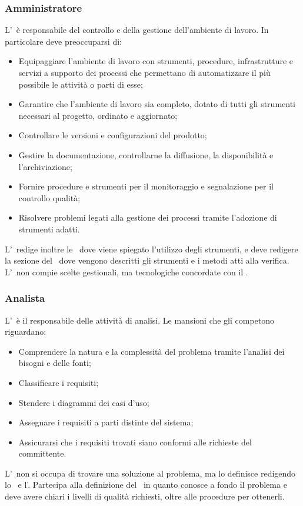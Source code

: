 \documentclass[../NormeProgetto.tex]{subfiles}
\begin{document}
		\subsubsection{Amministratore}
		L'\amministratore\ è responsabile del controllo e della gestione dell'ambiente di lavoro. In particolare deve preoccuparsi di:
		\begin{itemize}
		\item Equipaggiare l'ambiente di lavoro con strumenti, procedure, infrastrutture e servizi a supporto dei processi che permettano di automatizzare il più possibile le attività o parti di esse;
		\item Garantire che l'ambiente di lavoro sia completo, dotato di tutti gli strumenti necessari al progetto, ordinato e aggiornato;
		\item Controllare le versioni e configurazioni del prodotto;
		\item Gestire la documentazione, controllarne la diffusione, la disponibilità e l'archiviazione;
		\item Fornire procedure e strumenti per il monitoraggio e segnalazione per il controllo qualità;
		\item Risolvere problemi legati alla gestione dei processi tramite l'adozione di strumenti adatti.
		\end{itemize}
		L'\amministratore\ redige inoltre le \normediprogetto\, dove viene spiegato l'utilizzo degli strumenti, e deve redigere la sezione del \pianodiqualifica\ dove vengono descritti gli strumenti e i metodi atti alla verifica. L'\amministratore\ non compie scelte gestionali, ma tecnologiche concordate con il \responsabilediprogetto.
		\subsubsection{Analista}
		L'\analista\ è il responsabile delle attività di analisi. Le mansioni che gli competono riguardano:
		\begin{itemize}
		\item Comprendere la natura e la complessità del problema tramite l'analisi dei bisogni e delle fonti;
		\item Classificare i requisiti;
		\item Stendere i diagrammi dei casi d'uso;
		\item Assegnare i requisiti a parti distinte del sistema;
		\item Assicurarsi che i requisiti trovati siano conformi alle richieste del committente.
		\end{itemize}
		L'\analista\ non si occupa di trovare una soluzione al problema, ma lo definisce redigendo lo \studiodifattibilita\ e l'\analisideirequisiti. Partecipa alla definizione del \pianodiqualifica\ in quanto conosce a fondo il problema e deve avere chiari i livelli di qualità richiesti, oltre alle procedure per ottenerli. 
\end{document}
